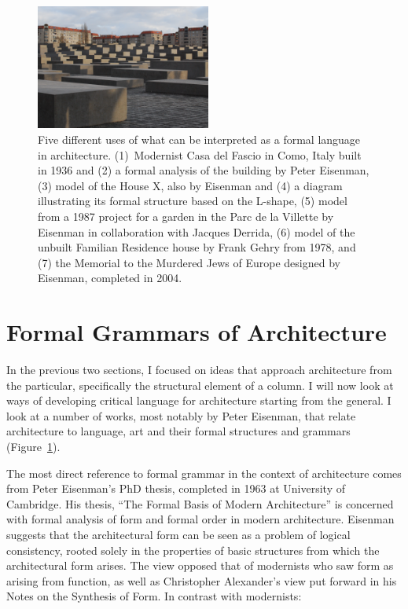 \begin{figure}
\includegraphics[height=11.1em]{chapters/fig/grammar-memorial.jpg}
\caption{Five different uses of what can be interpreted as a formal language in architecture.
(1)~Modernist Casa del Fascio in Como, Italy built in 1936 and (2) a formal analysis of the building
by Peter Eisenman, (3) model of the House X, also by Eisenman and (4) a diagram illustrating
its formal structure based on the L-shape, (5) model from a 1987 project for a garden in the
Parc de la Villette by Eisenman in collaboration with Jacques Derrida, (6) model of the unbuilt
Familian Residence house by Frank Gehry from 1978, and (7) the Memorial to the Murdered Jews of
Europe designed by Eisenman, completed in 2004.}
\label{fig:grammar}
\vspace{-0.5em}
\end{figure}

\section{Formal Grammars of Architecture}

In the previous two sections, I focused on ideas that approach architecture from
the particular, specifically the structural element of a column. I will now look at ways
of developing critical language for architecture starting from the general.
I look at a number of works, most notably by Peter Eisenman, that relate architecture to
language, art and their formal structures and grammars (Figure~\ref{fig:grammar}).

The most direct reference to formal grammar in the context of architecture comes
from Peter Eisenman's PhD thesis, completed in 1963 at University of Cambridge. His thesis,
``The Formal Basis of Modern Architecture'' is concerned with formal analysis of
form and formal order in modern architecture. Eisenman suggests that the architectural form
can be seen as a problem of logical consistency, rooted solely in the properties of basic
structures from which the architectural form arises. The view opposed that of modernists who saw
form as arising from function, as well as Christopher Alexander's view put forward in his
Notes on the Synthesis of Form. In contrast with modernists:


